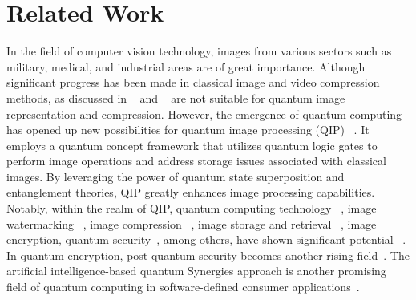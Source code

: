 \section{Related Work}
\label{L_R}
In the field of computer vision technology, images from various sectors such as military, medical, and industrial areas are of great importance. Although significant progress has been made in classical image and video compression methods, as discussed in ~\cite{paul2005real} and ~\cite{paul2018efficient} are not suitable for quantum image representation and compression. However, the emergence of quantum computing has opened up new possibilities for quantum image processing (QIP) ~\cite{b11}. It employs a quantum concept framework that utilizes quantum logic gates to perform image operations and address storage issues associated with classical images. By leveraging the power of quantum state superposition and entanglement theories, QIP greatly enhances image processing capabilities. Notably, within the realm of QIP, quantum computing technology ~\cite{yan2017quantum}, image watermarking ~\cite{song2014dynamic, song2013dynamic, iliyasu2012watermarking, hu2019quantum, kong2010color}, image compression ~\cite{b13, pm}, image storage and retrieval ~\cite{li2014multi}, image encryption, quantum security~\cite{peelam2024explorative}, among others, have shown significant potential ~\cite{wang2022efficient, wang2014novel}. In quantum encryption, post-quantum security becomes another rising field~\cite{khan2024chaotic}. The artificial intelligence-based quantum Synergies approach is another promising field of quantum computing in software-defined consumer applications~\cite{awan2024artificial,wu2022state}. 

